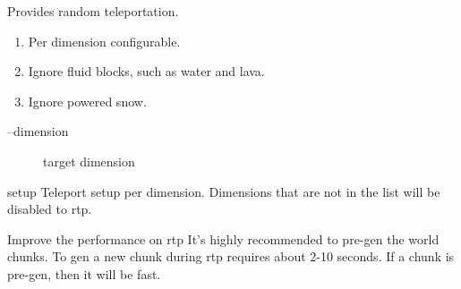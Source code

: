 
Provides random teleportation.

\begin{enumerate}
    \item Per dimension configurable.
    \item Ignore fluid blocks, such as water and lava.
    \item Ignore powered snow.
\end{enumerate}

\begin{description}
    \item [--dimension] target dimension
\end{description}

\begin{Configuration}
    \item[setup]{
        Teleport setup per dimension.
        Dimensions that are not in the list will be disabled to rtp.
    }
\end{Configuration}


\begin{tips}{Improve the performance on rtp}
    It's highly recommended to pre-gen the world chunks.
    To gen a new chunk during rtp requires about 2-10 seconds.
    If a chunk is pre-gen, then it will be fast.
\end{tips}


